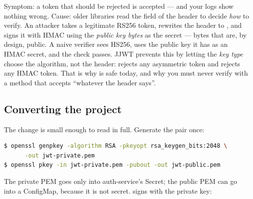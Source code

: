 \begin{pitfall}
Symptom: a token that should be rejected is accepted --- and your logs
show nothing wrong. Cause: older libraries read the  field of
the header to decide \emph{how} to verify. An attacker takes a legitimate
RS256 token, rewrites the header to , and signs it
with HMAC using the \emph{public key bytes} as the secret --- bytes that
are, by design, public. A naive verifier sees HS256, uses the public key
it has as an HMAC secret, and the check passes. JJWT prevents this by
letting the \emph{key type} choose the algorithm, not the header:
 rejects any asymmetric token and
 rejects any HMAC token. That is why
 is safe today, and why you must never
verify with a method that accepts ``whatever the header says''.
\end{pitfall}

\subsection{Converting the project}

The change is small enough to read in full. Generate the pair once:

\begin{lstlisting}[language=bash]
$ openssl genpkey -algorithm RSA -pkeyopt rsa_keygen_bits:2048 \
      -out jwt-private.pem
$ openssl pkey -in jwt-private.pem -pubout -out jwt-public.pem
\end{lstlisting}

The private PEM goes only into auth-service's Secret; the public PEM can
go into a ConfigMap, because it is not secret. \code{JwtService} signs
with the private key:

